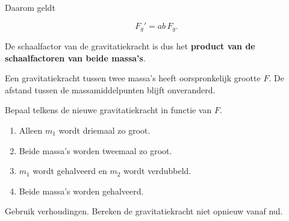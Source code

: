 \documentclass{ximera}
\begin{document}
Daarom geldt

\[
\boxed{
F_g'=ab\,F_g.
}
\]

De schaalfactor van de gravitatiekracht is dus het
\textbf{product van de schaalfactoren van beide massa's}.


\begin{oefening}{\oefB\ESS}

Een gravitatiekracht tussen twee massa's heeft oorspronkelijk
grootte $F$. De afstand tussen de massamiddelpunten blijft
onveranderd.

Bepaal telkens de nieuwe gravitatiekracht in functie van $F$.

\begin{enumerate}
  \item Alleen $m_1$ wordt driemaal zo groot.
  \item Beide massa's worden tweemaal zo groot.
  \item $m_1$ wordt gehalveerd en $m_2$ wordt verdubbeld.
  \item Beide massa's worden gehalveerd.
\end{enumerate}

Gebruik verhoudingen. Bereken de gravitatiekracht niet opnieuw vanaf
nul.

\end{oefening}
\end{document}

